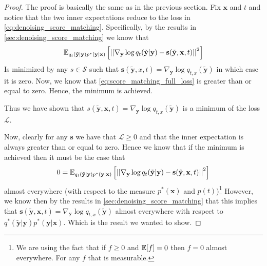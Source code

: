 \begin{proof}
    The proof is basically the same as in the previous section.
    Fix $\mathbf{x}$ and $t$ and notice that the two inner expectations reduce
    to the loss in \cref{eq:denoising_score_matching}.
    Specifically, by the results in \cref{sec:denoising_score_matching} we know that
    \[ \mathbb{E}_{q_{t}(\tilde{\mathbf{y}}|\mathbf{y})p^*(\mathbf{y}|\mathbf{x})} \left[ \left|\left| \nabla_{\mathbf{y}} \log q_{t}(\tilde{\mathbf{y}}|\mathbf{y}) - \mathbf{s}(\tilde{\mathbf{y}}, \mathbf{x}, t) \right|\right|^2 \right] \]
    Is minimized by any $s \in \mathcal{S}$ such that $\mathbf{s}(\tilde{\mathbf{y}}, x, t) = \nabla_{\mathbf{y}} \log q_{t,x}(\tilde{\mathbf{y}})$ in which
    case it is zero.
    Now, we know that \cref{eq:score_matching_full_loss} is greater than or equal to zero.
    Hence, the minimum is achieved.

    Thus we have shown that $s(\tilde{\mathbf{y}}, \mathbf{x}, t) = \nabla_{\mathbf{y}} \log q_{t,x}(\tilde{\mathbf{y}})$
    is a minimum of the loss $\mathcal{L}$.

    Now, clearly for any $\mathbf{s}$ we have that $\mathcal{L} \geq 0$
    and that the inner expectation is always greater than or equal to zero.
    Hence we know that if the minimum is achieved then it must be the case
    that
    \[ 0 = \mathbb{E}_{q_{t}(\tilde{\mathbf{y}}|\mathbf{y})p^*(\mathbf{y}|\mathbf{x})} \left[ \left|\left| \nabla_{\mathbf{y}} \log q_{t}(\tilde{\mathbf{y}}|\mathbf{y}) - \mathbf{s}(\tilde{\mathbf{y}}, \mathbf{x}, t) \right|\right|^2 \right] \]
    almost everywhere (with respect to the measure $p^*(\mathbf{x})$ and $p(t)$)\footnote{
        We are using the fact that if $f \geq 0$ and $\mathbb{E}[f] = 0$ then $f = 0$ almost everywhere.
        For any $f$ that is measurable.
    }
    However, we know then by the results in \cref{sec:denoising_score_matching} that
    this implies that $\mathbf{s}(\tilde{\mathbf{y}}, \mathbf{x}, t) = \nabla_{\mathbf{y}} \log q_{t,x}(\tilde{\mathbf{y}})$
    almost everywhere with respect to $q^*(\tilde{\mathbf{y}}|\mathbf{y})p^*(\mathbf{y}|\mathbf{x})$.
    Which is the result we wanted to show.





\end{proof}
